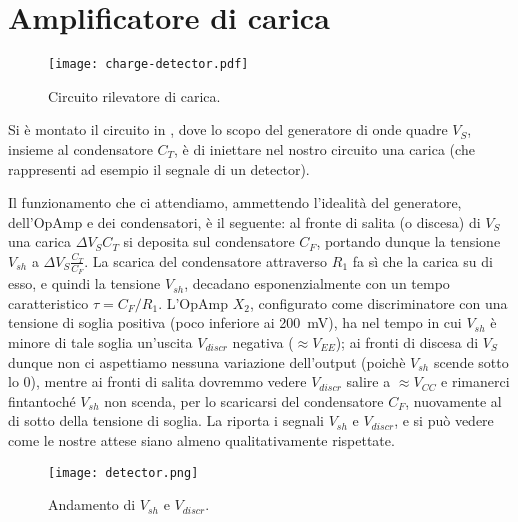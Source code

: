\section{Amplificatore di carica}

\begin{figure}[h]
	\centering
	\texttt{[image: charge-detector.pdf]}
	\caption{Circuito rilevatore di carica.}
	\label{f:circ_detq}
\end{figure}

Si è montato il circuito in , dove lo scopo del generatore di onde quadre $V_S$, insieme al condensatore $C_T$, è di iniettare nel nostro circuito una carica (che rappresenti ad esempio il segnale di un detector).

Il funzionamento che ci attendiamo, ammettendo l'idealità del generatore, dell'OpAmp e dei condensatori, è il seguente: al fronte di salita (o discesa) di $V_S$ una carica $\Delta V_S C_T$ si deposita sul condensatore $C_F$, portando dunque la tensione $V_{sh}$ a $\Delta V_S \frac{C_T}{C_F}$. La scarica del condensatore attraverso $R_1$ fa sì che la carica su di esso, e quindi la tensione $V_{sh}$, decadano esponenzialmente con un tempo caratteristico $\tau = C_F / R_1$. L'OpAmp $X_2$, configurato come discriminatore con una tensione di soglia positiva (poco inferiore ai \SI{200}{\mV}), ha nel tempo in cui $V_{sh}$ è minore di tale soglia un'uscita $V_{discr}$ negativa ($\approx V_{EE}$); ai fronti di discesa di $V_S$ dunque non ci aspettiamo nessuna variazione dell'output (poichè $V_{sh}$ scende sotto lo 0), mentre ai fronti di salita dovremmo vedere $V_{discr}$ salire a $\approx V_{CC}$ e rimanerci fintantoché $V_{sh}$ non scenda, per lo scaricarsi del condensatore $C_F$, nuovamente al di sotto della tensione di soglia. La  riporta i segnali $V_{sh}$ e $V_{discr}$, e si può vedere come le nostre attese siano almeno qualitativamente rispettate.

\begin{figure}[h]
	\centering
	\texttt{[image: detector.png]}
	\caption{Andamento di $V_{sh}$ e $V_{discr}$.}
	\label{f:det_norm}
\end{figure}
